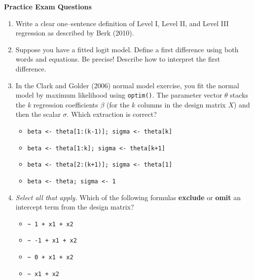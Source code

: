\documentclass[12pt]{article}
\begin{document}
\begin{center}
\LARGE\textbf{Practice Exam Questions}
\end{center}

\normalsize

\begin{enumerate}[label=\textbf{\arabic*.}]

\item Write a clear one--sentence definition of Level I, Level II, and Level III regression as described by Berk (2010).
\newpage

\item Suppose you have a fitted logit model. Define a first difference using both words and equations. Be precise! Describe how to interpret the first difference.


\newpage

\item In the Clark and Golder (2006) normal model exercise, you fit the normal model by maximum likelihood using \verb|optim()|. The parameter vector \(\theta\) stacks the \(k\) regression coefficients \(\beta\) (for the \(k\) columns in the design matrix \(X\)) and then the scalar \(\sigma\). Which extraction is correct?
\begin{itemize}
  \item[A.] \verb|beta <- theta[1:(k-1)]; sigma <- theta[k]|
  \item[B.] \verb|beta <- theta[1:k]; sigma <- theta[k+1]| %
  \item[C.] \verb|beta <- theta[2:(k+1)]; sigma <- theta[1]|
  \item[D.] \verb|beta <- theta; sigma <- 1|
\end{itemize}

\item \textit{Select all that apply.} Which of the following formulas \textbf{exclude} or \textbf{omit} an intercept term from the design matrix?
\begin{itemize}
  \item[A.] \verb|~ 1 + x1 + x2| %
  \item[B.] \verb|~ -1 + x1 + x2|
  \item[C.] \verb|~ 0 + x1 + x2|
  \item[D.] \verb|~ x1 + x2| %
\end{itemize}


\end{enumerate}
\end{document}
